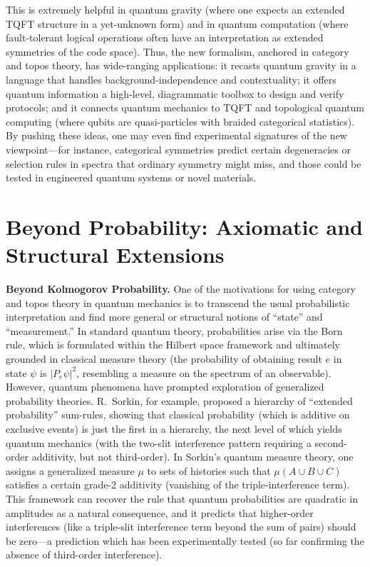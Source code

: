 \documentclass[12pt]{article}
\begin{document}
This is extremely helpful in quantum gravity (where one expects an extended TQFT structure in a yet-unknown form) and in quantum computation (where fault-tolerant logical operations often have an interpretation as extended symmetries of the code space). Thus, the new formalism, anchored in category and topos theory, has wide-ranging applications: it recasts quantum gravity in a language that handles background-independence and contextuality; it offers quantum information a high-level, diagrammatic toolbox to design and verify protocols; and it connects quantum mechanics to TQFT and topological quantum computing (where qubits are quasi-particles with braided categorical statistics). By pushing these ideas, one may even find experimental signatures of the new viewpoint---for instance, categorical symmetries predict certain degeneracies or selection rules in spectra that ordinary symmetry might miss, and those could be tested in engineered quantum systems or novel materials.


\section{Beyond Probability: Axiomatic and Structural Extensions}

\textbf{Beyond Kolmogorov Probability.} One of the motivations for using category and topos theory in quantum mechanics is to transcend the usual probabilistic interpretation and find more general or structural notions of ``state'' and ``measurement.'' In standard quantum theory, probabilities arise via the Born rule, which is formulated within the Hilbert space framework and ultimately grounded in classical measure theory (the probability of obtaining result $e$ in state $\psi$ is $\lvert P_e \psi \rvert^2$, resembling a measure on the spectrum of an observable). However, quantum phenomena have prompted exploration of generalized probability theories. R.\ Sorkin, for example, proposed a hierarchy of ``extended probability'' sum-rules, showing that classical probability (which is additive on exclusive events) is just the first in a hierarchy, the next level of which yields quantum mechanics (with the two-slit interference pattern requiring a second-order additivity, but not third-order). In Sorkin’s quantum measure theory, one assigns a generalized measure $\mu$ to sets of histories such that $\mu(A\cup B\cup C)$ satisfies a certain grade-2 additivity (vanishing of the triple-interference term). This framework can recover the rule that quantum probabilities are quadratic in amplitudes as a natural consequence, and it predicts that higher-order interferences (like a triple-slit interference term beyond the sum of pairs) should be zero---a prediction which has been experimentally tested (so far confirming the absence of third-order interference).
\end{document}

